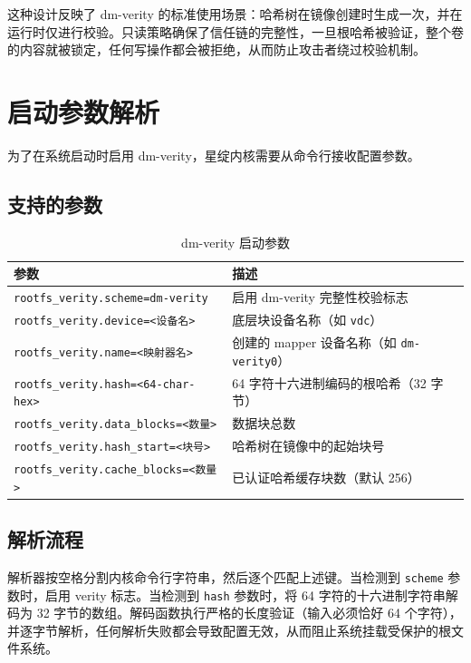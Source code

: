 这种设计反映了 dm-verity 的标准使用场景：哈希树在镜像创建时生成一次，并在运行时仅进行校验。只读策略确保了信任链的完整性，一旦根哈希被验证，整个卷的内容就被锁定，任何写操作都会被拒绝，从而防止攻击者绕过校验机制。

\section{启动参数解析}

为了在系统启动时启用 dm-verity，星绽内核需要从命令行接收配置参数。

\subsection{支持的参数}

\begin{table}[H]
    \centering
    \caption{dm-verity 启动参数}
    \label{tab:verity_boot_params}
    \begin{tabular}{p{}p{}}
        \toprule
        \textbf{参数} & \textbf{描述} \\
        \midrule
        \texttt{rootfs\_verity.scheme=dm-verity} & 启用 dm-verity 完整性校验标志 \\
        \texttt{rootfs\_verity.device=<设备名>} & 底层块设备名称（如 \texttt{vdc}） \\
        \texttt{rootfs\_verity.name=<映射器名>} & 创建的 mapper 设备名称（如 \texttt{dm-verity0}） \\
        \texttt{rootfs\_verity.hash=<64-char-hex>} & 64 字符十六进制编码的根哈希（32 字节） \\
        \texttt{rootfs\_verity.data\_blocks=<数量>} & 数据块总数 \\
        \texttt{rootfs\_verity.hash\_start=<块号>} & 哈希树在镜像中的起始块号 \\
        \texttt{rootfs\_verity.cache\_blocks=<数量>} & 已认证哈希缓存块数（默认 256） \\
        \bottomrule
    \end{tabular}
\end{table}

\subsection{解析流程}

解析器按空格分割内核命令行字符串，然后逐个匹配上述键。当检测到 \texttt{scheme} 参数时，启用 verity 标志。当检测到 \texttt{hash} 参数时，将 64 字符的十六进制字符串解码为 32 字节的数组。解码函数执行严格的长度验证（输入必须恰好 64 个字符），并逐字节解析，任何解析失败都会导致配置无效，从而阻止系统挂载受保护的根文件系统。

